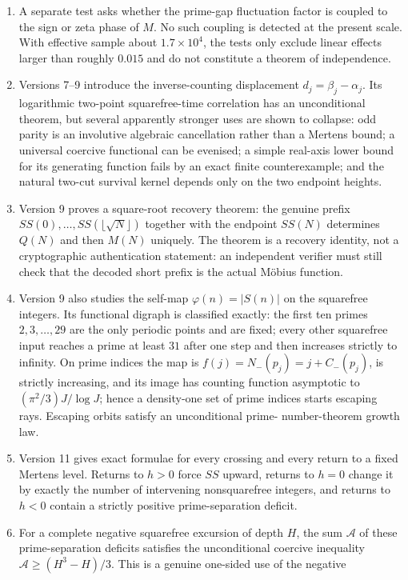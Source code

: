 \documentclass[11pt]{amsart}
\numberwithin{equation}{section}
\theoremstyle{plain}
\theoremstyle{definition}
\theoremstyle{remark}
\begin{document}
\begin{enumerate}[label=(\roman*)]
\item A separate test asks whether the prime-gap fluctuation factor is coupled to
the sign or zeta phase of $M$. No such coupling is detected at the present
scale. With effective sample about $1.7\times10^4$, the tests only exclude
linear effects larger than roughly $0.015$ and do not constitute a theorem of
independence.
\item Versions 7--9 introduce the inverse-counting displacement
$d_j=\beta_j-\alpha_j$.  Its logarithmic two-point squarefree-time correlation
has an unconditional theorem, but several apparently stronger uses are shown
to collapse: odd parity is an involutive algebraic cancellation rather than a
Mertens bound; a universal coercive functional can be evenised; a simple
real-axis lower bound for its generating function fails by an exact finite
counterexample; and the natural two-cut survival kernel depends only on the
two endpoint heights.
\item Version 9 proves a square-root recovery theorem: the genuine prefix
$SS(0),\ldots,SS(\lfloor\sqrt N\rfloor)$ together with the endpoint $SS(N)$
determines $Q(N)$ and then $M(N)$ uniquely.  The theorem is a recovery identity,
not a cryptographic authentication statement: an independent verifier must still
check that the decoded short prefix is the actual M\"obius function.
\item Version 9 also studies the self-map $\varphi(n)=|S(n)|$ on the squarefree
integers.  Its functional digraph is classified exactly: the first ten primes
$2,3,\ldots,29$ are the only periodic points and are fixed; every other
squarefree input reaches a prime at least $31$ after one step and then increases
strictly to infinity.  On prime indices the map is
$f(j)=N_-(p_j)=j+C_-(p_j)$, is strictly increasing, and its image has counting
function asymptotic to $(\pi^2/3)J/\log J$; hence a density-one set of prime
indices starts escaping rays.  Escaping orbits satisfy an unconditional prime-
number-theorem growth law.
\item Version 11 gives exact formulae for every crossing and every return to a
fixed Mertens level.  Returns to $h>0$ force $SS$ upward, returns to $h=0$
change it by exactly the number of intervening nonsquarefree integers, and
returns to $h<0$ contain a strictly positive prime-separation deficit.
\item For a complete negative squarefree excursion of depth $H$, the sum
$\mathcal A$ of these prime-separation deficits satisfies the unconditional
coercive inequality
$\mathcal A\ge (H^3-H)/3$.  This is a genuine one-sided use of the negative

\end{enumerate}
\end{document}
